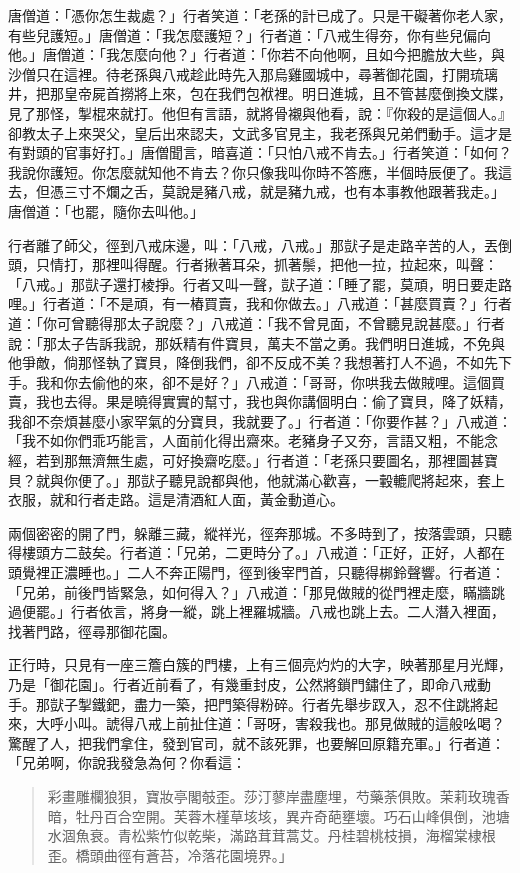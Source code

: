 唐僧道：「憑你怎生裁處？」行者笑道：「老孫的計已成了。只是干礙著你老人家，有些兒護短。」唐僧道：「我怎麼護短？」行者道：「八戒生得夯，你有些兒偏向他。」唐僧道：「我怎麼向他？」行者道：「你若不向他啊，且如今把膽放大些，與沙僧只在這裡。待老孫與八戒趁此時先入那烏雞國城中，尋著御花園，打開琉璃井，把那皇帝屍首撈將上來，包在我們包袱裡。明日進城，且不管甚麼倒換文牒，見了那怪，掣棍來就打。他但有言語，就將骨襯與他看，說：『你殺的是這個人。』卻教太子上來哭父，皇后出來認夫，文武多官見主，我老孫與兄弟們動手。這才是有對頭的官事好打。」唐僧聞言，暗喜道：「只怕八戒不肯去。」行者笑道：「如何？我說你護短。你怎麼就知他不肯去？你只像我叫你時不答應，半個時辰便了。我這去，但憑三寸不爛之舌，莫說是豬八戒，就是豬九戒，也有本事教他跟著我走。」唐僧道：「也罷，隨你去叫他。」

行者離了師父，徑到八戒床邊，叫：「八戒，八戒。」那獃子是走路辛苦的人，丟倒頭，只情打，那裡叫得醒。行者揪著耳朵，抓著鬃，把他一拉，拉起來，叫聲：「八戒。」那獃子還打棱掙。行者又叫一聲，獃子道：「睡了罷，莫頑，明日要走路哩。」行者道：「不是頑，有一樁買賣，我和你做去。」八戒道：「甚麼買賣？」行者道：「你可曾聽得那太子說麼？」八戒道：「我不曾見面，不曾聽見說甚麼。」行者說：「那太子告訴我說，那妖精有件寶貝，萬夫不當之勇。我們明日進城，不免與他爭敵，倘那怪執了寶貝，降倒我們，卻不反成不美？我想著打人不過，不如先下手。我和你去偷他的來，卻不是好？」八戒道：「哥哥，你哄我去做賊哩。這個買賣，我也去得。果是曉得實實的幫寸，我也與你講個明白：偷了寶貝，降了妖精，我卻不奈煩甚麼小家罕氣的分寶貝，我就要了。」行者道：「你要作甚？」八戒道：「我不如你們乖巧能言，人面前化得出齋來。老豬身子又夯，言語又粗，不能念經，若到那無濟無生處，可好換齋吃麼。」行者道：「老孫只要圖名，那裡圖甚寶貝？就與你便了。」那獃子聽見說都與他，他就滿心歡喜，一轂轆爬將起來，套上衣服，就和行者走路。這是清酒紅人面，黃金動道心。

兩個密密的開了門，躲離三藏，縱祥光，徑奔那城。不多時到了，按落雲頭，只聽得樓頭方二鼓矣。行者道：「兄弟，二更時分了。」八戒道：「正好，正好，人都在頭覺裡正濃睡也。」二人不奔正陽門，徑到後宰門首，只聽得梆鈴聲響。行者道：「兄弟，前後門皆緊急，如何得入？」八戒道：「那見做賊的從門裡走麼，瞞牆跳過便罷。」行者依言，將身一縱，跳上裡羅城牆。八戒也跳上去。二人潛入裡面，找著門路，徑尋那御花園。

正行時，只見有一座三簷白簇的門樓，上有三個亮灼灼的大字，映著那星月光輝，乃是「御花園」。行者近前看了，有幾重封皮，公然將鎖門鏽住了，即命八戒動手。那獃子掣鐵鈀，盡力一築，把門築得粉碎。行者先舉步䟕入，忍不住跳將起來，大呼小叫。諕得八戒上前扯住道：「哥呀，害殺我也。那見做賊的這般吆喝？驚醒了人，把我們拿住，發到官司，就不該死罪，也要解回原籍充軍。」行者道：「兄弟啊，你說我發急為何？你看這：
\begin{quote}
彩畫雕欄狼狽，寶妝亭閣攲歪。莎汀蓼岸盡塵埋，芍藥荼俱敗。茉莉玫瑰香暗，牡丹百合空開。芙蓉木槿草垓垓，異卉奇葩壅壞。巧石山峰俱倒，池塘水涸魚衰。青松紫竹似乾柴，滿路茸茸蒿艾。丹桂碧桃枝損，海榴棠棣根歪。橋頭曲徑有蒼苔，冷落花園境界。」
\end{quote}

